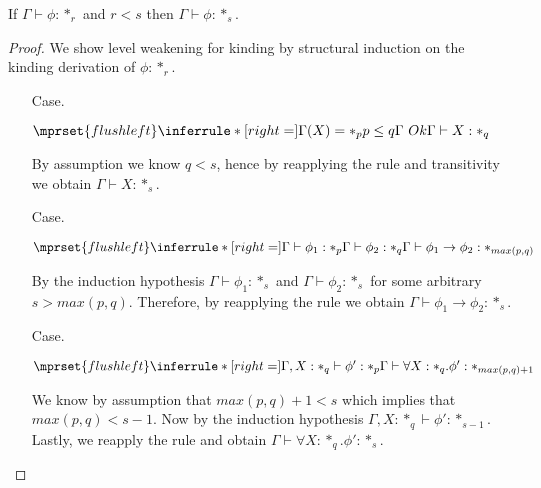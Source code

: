 \begin{lemma}
  If $\Gamma \vdash \phi:*_r$ and $r < s$ then $\Gamma \vdash \phi:*_s$.
  \label{lemma:level_weakening_for_kinding_ssf}
\end{lemma}
\begin{proof}
  We show level weakening for kinding by structural induction on the kinding derivation 
  of $\phi:*_r$.
  \begin{itemize}
  \item[Case.]\ \\
    \begin{center}
      \begin{math}
        $$\mprset{flushleft}
        \inferrule* [right=] {
          \Gamma(X) = *_p
          \\
          p \leq q
          \\
          \Gamma\ Ok
        }{\Gamma \vdash X : *_q}
      \end{math}
    \end{center}
    By assumption we know $q < s$, hence by reapplying the rule and transitivity we 
    obtain $\Gamma \vdash X:*_s$.
    
  \item[Case.]\ \\
    \begin{center}
      \begin{math}
        $$\mprset{flushleft}
        \inferrule* [right=] {
          \Gamma \vdash \phi_1 : *_p
          \\
          \Gamma \vdash \phi_2 : *_q
        }{\Gamma \vdash \phi_1 \rightarrow \phi_2 : *_{max(p,q)}}
      \end{math}
    \end{center}
    By the induction hypothesis $\Gamma \vdash \phi_1 : *_s$ and 
    $\Gamma \vdash \phi_2 : *_s$ for some arbitrary $s > max(p,q)$.  Therefore, by 
    reapplying the rule we obtain $\Gamma \vdash \phi_1 \rightarrow \phi_2 : *_s$.
    
  \item[Case.]\ \\
    \begin{center}
      \begin{math}
        $$\mprset{flushleft}
        \inferrule* [right=] {
          \Gamma,X : *_q \vdash \phi' : *_p
        }{\Gamma \vdash \forall X:*_q.\phi' : *_{max(p,q)+1}}
      \end{math}
    \end{center}
    We know by assumption that $max(p,q) + 1 < s$ which implies that $max(p,q) < s - 1$.  
    Now by the induction hypothesis $\Gamma,X:*_q \vdash \phi':*_{s-1}$.  Lastly, we 
    reapply the rule and obtain $\Gamma \vdash \forall X:*_q.\phi' : *_{s}$.
  \end{itemize}
\end{proof}

